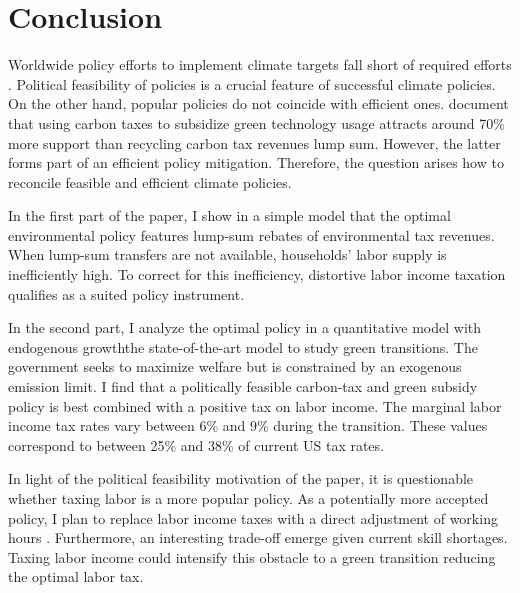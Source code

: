 \newpage
\section{Conclusion}\label{sec:con}

Worldwide policy efforts to implement climate targets fall short of required efforts \citep{IPCC2022}. Political feasibility of policies is a crucial feature of successful climate policies. On the other hand, popular policies do not coincide with efficient ones. \cite{Fabre2023Fighting} document that using carbon taxes to subsidize green technology usage attracts around 70\% more support than recycling carbon tax revenues lump sum. However, the latter forms part of an efficient policy mitigation. Therefore, the question arises how to reconcile feasible and efficient climate policies.


In the first part of the paper, I show in a simple model that the optimal environmental policy features lump-sum rebates of environmental tax revenues. When lump-sum transfers are not available, households' labor supply is inefficiently high. To correct for this inefficiency, distortive labor income taxation qualifies as a suited policy instrument. %


In the second part, I analyze the optimal policy in a quantitative model with  endogenous growth\textemdash the state-of-the-art model to study green transitions. The government seeks to maximize welfare but is constrained by an exogenous emission limit. 
I find that a politically feasible carbon-tax and green subsidy policy is best combined with a positive tax on labor income. The marginal labor income tax rates vary between 6\% and 9\% during the transition. These values correspond to between 25\% and 38\% of current US tax rates.


In light of the political feasibility motivation of the paper, it is questionable whether taxing labor is a more popular policy.  As a potentially more accepted policy, I plan to replace labor income taxes with a direct adjustment of working hours \citep{Alvarez-Cuadrado2007EnvyHours}. 
Furthermore, an interesting trade-off  emerge given current skill shortages. Taxing labor income could intensify this obstacle to a green transition reducing the optimal labor tax. 


